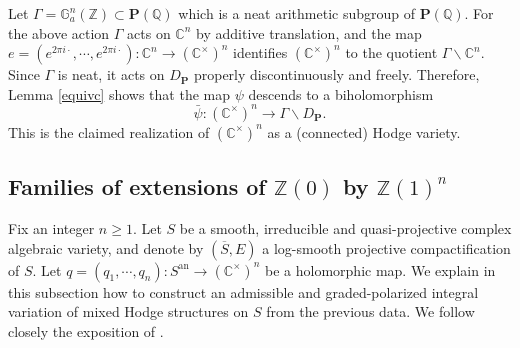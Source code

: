 \documentclass[10pt]{article}
\numberwithin{equation}{subsection}
\theoremstyle{plain}
\theoremstyle{definition}
\theoremstyle{remark}
\newcommand{\Z}{\mathbb Z}
\newcommand{\Q}{\mathbb Q}
\newcommand{\C}{\mathbb C}
\newcommand{\mult}{\mathbb G}
\newcommand{\pp}{\mathbf P}
\newcommand{\an}{\mathrm{an}}
\newcommand{\quo}{\backslash}
\begin{document}
Let $\Gamma = \mult_a^n(\Z) \subset \pp(\Q)$ which is a neat arithmetic subgroup of $\pp(\Q)$. For the above action $\Gamma$ acts on $\C^n$ by additive translation, and the map $e = (e^{2\pi i \cdot}, \cdots, e^{2\pi i \cdot}) : \C^n \rightarrow (\C^\times)^n$ identifies $(\C^\times)^n$ to the quotient $\Gamma \quo \C^n$. Since $\Gamma$ is neat, it acts on $D_\pp$ properly discontinuously and freely. Therefore, Lemma \ref{equivc} shows that the map $\psi$ descends to a biholomorphism
\[
\bar{\psi} : (\C^\times)^n \rightarrow \Gamma \quo D_\pp.
\]
This is the claimed realization of $(\C^\times)^n$ as a (connected) Hodge variety.
\subsection{Families of extensions of $\Z(0)$ by $\Z(1)^n$}\label{sect62}
Fix an integer $n \geqslant 1$. Let $S$ be a smooth, irreducible and quasi-projective complex algebraic variety, and denote by $(\overline{S}, E)$ a log-smooth projective compactification of $S$. Let $q = (q_1,\cdots,q_n) : S^\an \rightarrow (\C^\times)^n$ be a holomorphic map. We explain in this subsection how to construct an admissible and graded-polarized integral variation of mixed Hodge structures on $S$ from the previous data. We follow closely the exposition of \cite{dellocal}.
\end{document}
